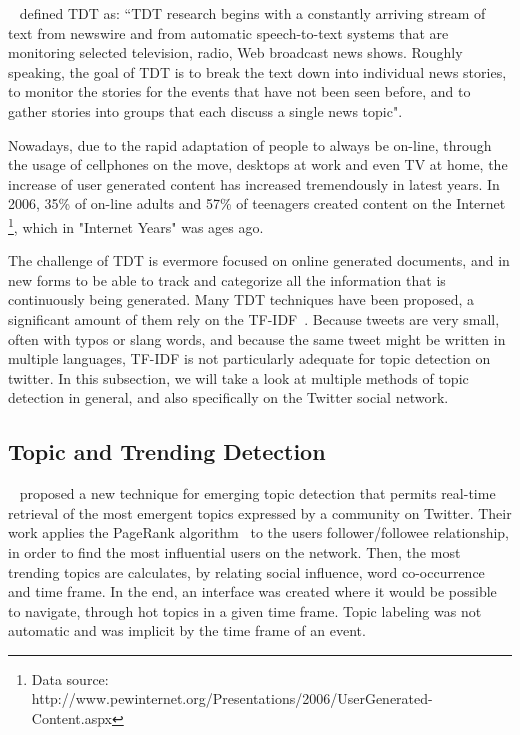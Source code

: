~\citet{allan2002topic} defined \ac{TDT} as: “\ac{TDT} research begins with a constantly arriving stream of text from newswire and from automatic speech-to-text systems that are monitoring selected television, radio, Web broadcast news shows. Roughly speaking, the goal of \ac{TDT} is to break the text down into individual news stories, to monitor the stories for the events that have not been seen before, and to gather stories into groups that each discuss a single news topic".

Nowadays, due to the rapid adaptation of people to always be on-line, through the usage of cellphones on the move, desktops at work and even TV at home, the increase of user generated content has increased tremendously in latest years. In 2006, 35\% of on-line adults and 57\% of teenagers created content on the Internet \footnote{ Data source: http://www.pewinternet.org/Presentations/2006/UserGenerated-Content.aspx}, which in "Internet Years" was ages ago. 

The challenge of \ac{TDT} is evermore focused on online generated documents, and in new forms to be able to track and categorize all the information that is continuously being generated.
Many \ac{TDT} techniques have been proposed,  a significant amount of them rely on the \ac{TF-IDF}~\cite{Baeza-Yates:1999:MIR:553876}. Because tweets are very small, often with typos or slang words, and because the same tweet might be written in multiple languages, \ac{TF-IDF} is not particularly adequate for topic detection on twitter. In this subsection, we will take a look at multiple methods of topic detection in general, and also specifically on the Twitter social network.

\subsection{Topic and Trending Detection} 
\label{sub:real_time_topic_and_trending_detection}
~\citet{Cataldi2010} proposed a new technique for emerging topic detection that permits real-time retrieval of the most emergent topics expressed by a community on Twitter. Their work applies the PageRank algorithm~\cite{Pagerank1998} to the users follower/followee relationship, in order to find the most influential users on the network. Then, the most trending topics are calculates, by relating social influence, word co-occurrence and time frame. In the end, an interface was created where it would be possible to navigate, through hot topics in a given time frame. Topic labeling was not automatic and was implicit by the time frame of an event.

